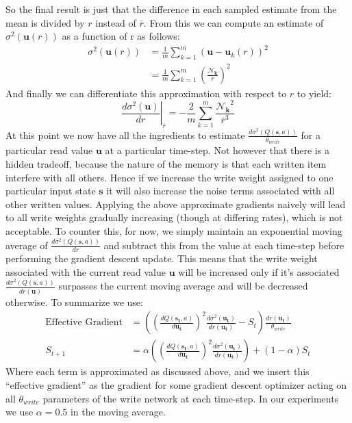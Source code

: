 \documentclass{article}
\begin{document}
So the final result is just that the difference in each sampled estimate from the mean is divided by $r$ instead of $\bar{r}$. From this we can compute an estimate of $\sigma^2(\pmb{u}(r))$ as a function of r as follows:
\begin{align*}
\sigma^2(\pmb{u}(r))&=\frac{1}{m}\sum_{k=1}^m(\pmb{u}-\pmb{u}_k(r))^2\\
&=\frac{1}{m}\sum_{k=1}^m\left(\frac{\pmb{\mathcal{N}_k}}{r}\right)^2
\end{align*}
And finally we can differentiate this approximation with respect to $r$ to yield:
$$\left.\frac{d\sigma^2(\pmb{u})}{dr}\right\rvert_{\bar{r}}=-\frac{2}{m}\sum_{k=1}^m\frac{\pmb{\mathcal{N}_k}^2}{\bar{r}^3}$$
At this point we now have all the ingredients to estimate $\frac{d\sigma^2(Q(\pmb{s},a))}{\theta_{write}}$ for a particular read value $\pmb{u}$ at a particular time-step. Not however that there is a hidden tradeoff, because the nature of the memory is that each written item interfere with all others. Hence if we increase the write weight assigned to one particular input state $\pmb{s}$ it will also increase the noise terms associated with all other written values. Applying the above approximate gradients naively will lead to all write weights gradually increasing (though at differing rates), which is not acceptable. To counter this, for now, we simply maintain an exponential moving average of $\frac{d\sigma^2(Q(\pmb{s},a))}{dr}$ and subtract this from the value at each time-step before performing the gradient descent update. This means that the write weight associated with the current read value $\pmb{u}$ will be increased only if it's associated $\frac{d\sigma^2(Q(\pmb{s},a))}{dr(\pmb{u})}$ surpasses the current moving average and will be decreased otherwise. To summarize we use:
\begin{align*}
\text{Effective Gradient}&=\left(\left(\frac{dQ(\pmb{s_t},a)}{d\pmb{u_t}}\right)^2\frac{d\sigma^2(\pmb{u_t})}{dr(\pmb{u_t})}-S_t\right)\frac{dr(\pmb{u_t})}{\theta_{write}}\\
S_{t+1} &=\alpha\left(\left(\frac{dQ(\pmb{s_t},a)}{d\pmb{u_t}}\right)^2\frac{d\sigma^2(\pmb{u_t})}{dr(\pmb{u_t})}\right)+(1-\alpha)S_t
\end{align*}
Where each term is approximated as discussed above, and we insert this ``effective gradient'' as the gradient for some gradient descent optimizer acting on all $\theta_{write}$ parameters of the write network at each time-step. In our experiments we use $\alpha=0.5$ in the moving average.
\end{document}
